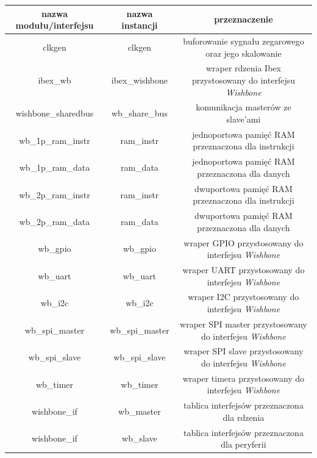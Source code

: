 \documentclass[11pt,a4paper]{article}
\begin{document}
			\begin{center}
			\small
				\begin{tabular}{|c|c|c|}
					\hline
					nazwa modułu/interfejsu & nazwa instancji & przeznaczenie \\
					\hline
					clkgen & clkgen & buforowanie sygnału zegarowego oraz jego skalowanie \\
					\hline
					ibex\_wb & ibex\_wishbone & wraper rdzenia Ibex przystosowany do interfejsu \textit{Wishbone}  \\
					\hline
					wishbone\_sharedbus & wb\_share\_bus & komunikacja masterów ze slave'ami \\
					\hline
					wb\_1p\_ram\_instr & ram\_instr & jednoportowa pamięć RAM przeznaczona dla instrukcji \\
					\hline
					wb\_1p\_ram\_data & ram\_data & jednoportowa pamięć RAM przeznaczona dla danych \\
					\hline
					wb\_2p\_ram\_instr & ram\_instr & dwuportowa pamięć RAM przeznaczona dla instrukcji \\
					\hline
					wb\_2p\_ram\_data & ram\_data & dwuportowa pamięć RAM przeznaczona dla danych \\
					\hline
					wb\_gpio & wb\_gpio & wraper GPIO przystosowany do interfejsu \textit{Wishbone} \\
					\hline		
					wb\_uart & wb\_uart & wraper UART przystosowany do interfejsu \textit{Wishbone} \\
					\hline	
					wb\_i2c & wb\_i2c & wraper I2C przystosowany do interfejsu \textit{Wishbone} \\
					\hline		
					wb\_spi\_master & wb\_spi\_master & wraper SPI master przystosowany do interfejsu \textit{Wishbone} \\
					\hline	
					wb\_spi\_slave & wb\_spi\_slave & wraper SPI slave przystosowany do interfejsu \textit{Wishbone} \\
					\hline		
					wb\_timer & wb\_timer & wraper timera przystosowany do interfejsu \textit{Wishbone} \\
					\hline			
					wishbone\_if & wb\_master & tablica interfejsów przeznaczona dla rdzenia \\
					\hline		
					wishbone\_if & wb\_slave & tablica interfejsów przeznaczona dla peryferii \\
					\hline													
				\end{tabular}
		\end{center}
\end{document}
